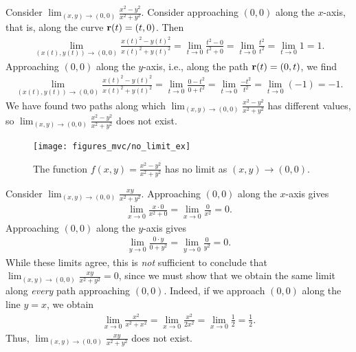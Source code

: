\documentclass[12pt,letterpaper,reqno]{article}
\numberwithin{equation}{section}
\newcommand{\bbr}{{\bf r}}
\begin{document}
{\begin{example}
Consider $\lim_{(x,y) \to (0,0)}\frac{x^2-y^2}{x^2+y^2}$. Consider approaching $(0,0)$ along the $x$-axis, that is, along the curve $\bbr(t)=(t,0)$. Then
\begin{align*}
	\lim_{(x(t),y(t)) \to (0,0)}\frac{x(t)^2-y(t)^2}{x(t)^2+y(t)^2}=\lim_{t \to 0}\frac{t^2-0}{t^2+0}=\lim_{t \to 0}\frac{t^2}{t^2}=\lim_{t \to 0}1=1.
\end{align*}
Approaching $(0,0)$ along the $y$-axis, i.e., along the path $\bbr(t)=(0,t)$, we find
	\begin{align*}
	\lim_{(x(t),y(t)) \to (0,0)}\frac{x(t)^2-y(t)^2}{x(t)^2+y(t)^2}=\lim_{t \to 0}\frac{0-t^2}{0+t^2}=\lim_{t \to 0}\frac{-t^2}{t^2}=\lim_{t \to 0}(-1)=-1.
\end{align*}
We have found two paths along which $\lim_{(x,y) \to (0,0)}\frac{x^2-y^2}{x^2+y^2}$ has different values, so $\lim_{(x,y) \to (0,0)}\frac{x^2-y^2}{x^2+y^2}$ does not exist.
\end{example}

\begin{figure}[h]
	\begin{center}
		\texttt{[image: figures\_mvc/no\_limit\_ex]}
	\end{center}
	\caption{The function $f(x,y)=\frac{x^2-y^2}{x^2+y^2}$ has no limit as $(x,y) \to (0,0)$.}
\end{figure}

\begin{example}
	Consider $\lim_{(x,y) \to (0,0)}\frac{xy}{x^2+y^2}$. Approaching $(0,0)$ along the $x$-axis gives
	\begin{align*}
		\lim_{x \to 0} \frac{x \cdot 0}{x^2+0}=\lim_{x \to 0} \frac{0}{x^2}=0.
	\end{align*}
	Approaching $(0,0)$ along the $y$-axis gives
	\begin{align*}
		\lim_{y \to 0} \frac{0 \cdot y}{0+y^2}=\lim_{y \to 0} \frac{0}{y^2}=0.
	\end{align*}
While these limits agree, this is \emph{not} sufficient to conclude that $\lim_{(x,y) \to (0,0)}\frac{xy}{x^2+y^2}=0$, since we must show that we obtain the same limit along \emph{every} path approaching $(0,0)$. Indeed, if we approach $(0,0)$ along the line $y=x$, we obtain
\begin{align*}
	\lim_{x \to 0}\frac{x^2}{x^2+x^2}=\lim_{x \to 0}\frac{x^2}{2x^2}=\lim_{x \to 0}\frac{1}{2}=\frac{1}{2}.
\end{align*}
Thus, $\lim_{(x,y) \to (0,0)}\frac{xy}{x^2+y^2}$ does not exist.
\end{example}

}
\end{document}
